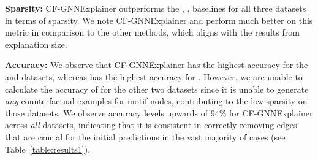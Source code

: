 \pagebreak

\medskip \noindent
\textbf{Sparsity:}
CF-GNNExplainer outperforms the \baserand{}, \baserm{}, \basekeep{} baselines for all three datasets in terms of sparsity.
We note CF-GNNExplainer and \baserm{} perform much better on this metric in comparison to the other methods, which aligns with the results from explanation size. 

\medskip \noindent
\textbf{Accuracy:}
We observe that CF-GNNExplainer has the highest accuracy for the \synfour{} and \synfive{} datasets, whereas \baserm{} has the highest accuracy for \synone{}. 
However, we are unable to calculate the accuracy of \baserm{} for the other two datasets since it is unable to generate \emph{any} counterfactual examples for motif nodes, contributing to the low sparsity on those datasets. 
We observe accuracy levels upwards of 94\% for CF-GNNExplainer across \emph{all} datasets, indicating that it is consistent in correctly removing edges that are crucial for the initial predictions in the vast majority of cases (see Table~\ref{table:results1}). 






